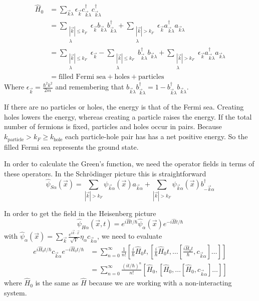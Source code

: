 \begin{align*}
\hat{H}_0 &= \sum_{\vec{k}\lambda} \epsilon_{\vec{k}}c^\dagger_{\vec{k}\lambda}c^\dagger_{\vec{k}\lambda} \\
&= \sum_{\substack{|\vec{k}|\leq k_F \\ \lambda}} \epsilon_{\vec{k}} b_{\vec{k}\lambda}b^\dagger_{\vec{k}\lambda} + \sum_{\substack{|\vec{k}|> k_F \\ \lambda}} \epsilon_{\vec{k}} a^\dagger_{\vec{k}\lambda}a_{\vec{k}\lambda} \\
&= \sum_{\substack{|\vec{k}|\leq k_F \\ \lambda}} \epsilon_{\vec{k}}- \sum_{\substack{|\vec{k}|\leq k_F \\ \lambda}} b^\dagger_{\vec{k}\lambda}b_{\vec{k}\lambda} + \sum_{\substack{|\vec{k}|> k_F \\ \lambda}} \epsilon_{\vec{k}} a^\dagger_{\vec{k}\lambda}a_{\vec{k}\lambda} \\
&= \text{filled Fermi sea} + \text{holes} + \text{particles}
\end{align*}
Where $\epsilon_{\vec{k}} = \frac{\hbar^2k^2}{2m}$ and remembering that $b_{\vec{k}\lambda}b^\dagger_{\vec{k}\lambda} = 1 - b^\dagger_{\vec{k}\lambda}b_{\vec{k}\lambda}$.

If there are no particles or holes, the energy is that of the Fermi sea. Creating holes lowers the energy, whereas creating a particle raises the energy. If the total number of fermions is fixed, particles and holes occur in pairs. Because $k_\text{particle}>k_F\geq k_{\text{hole}}$ each particle-hole pair has has a net positive energy. So the filled Fermi sea represents the ground state.

In order to calculate the Green's function, we need the operator fields in terms of these operators. In the Schrödinger picture this is straightforward
\[ \hat{\psi}_{S\alpha}(\vec{x}) = \sum_{|\vec{k}|>k_F}\psi_{\vec{k}\alpha}(\vec{x})a_{\vec{k}\alpha} + \sum_{|\vec{k}|> k_F}\psi_{\vec{k}\alpha}(\vec{x})b^\dagger_{-\vec{k}\alpha} \]

In order to get the field in the Heisenberg picture
\[ \hat{\psi}_{H\alpha}(\vec{x},t) = e^{i\hat{H}t/\hbar}\hat{\psi}_\alpha(\vec{x}) e^{-i\hat{H}t / \hbar} \]
with $\hat{\psi}_\alpha(\vec{x}) = \sum_{\vec{k}} \frac{e^{i \vec{k} \cdot \vec{x}}}{\sqrt{V}}\eta_\alpha c_{\vec{k}\alpha}$, we need to evaluate
\begin{align*}
e^{i\hat{H}_0t / \hbar}c_{\vec{k}\alpha}e^{-i\hat{H}_0t / \hbar} &= \sum^\infty_{n=0} \frac{1}{n!}\left[\frac{i}{\hbar}\hat{H}_0t, \left[\frac{i}{\hbar}\hat{H}_0t, \ldots \left[\frac{i\hat{H}_0t}{\hbar}, c_{\vec{k}\alpha}\right]\ldots\right]\right] \\
&= \sum^\infty_{n=0} \frac{(it/\hbar)^n}{n!}\left[\hat{H}_0, \left[\hat{H}_0, \ldots \left[\hat{H}_0, c_{\vec{k}\alpha}\right]\ldots\right]\right]
\end{align*}
where $\hat{H}_0$ is the same as $\hat{H}$ because we are working with a non-interacting system.

